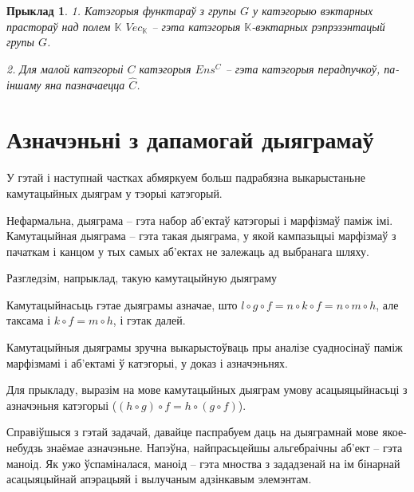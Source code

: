 \documentclass[a4paper,12pt]{book}
\newtheorem{example}{Прыклад}[section]
\begin{document}
\begin{example}
  1. Катэгорыя функтараў з групы $G$ у катэгорыю вэктарных прастораў над
  полем $\mathbb{K}$ $Vec_{\mathbb{K}}$ -- гэта катэгорыя
  $\mathbb{K}$-вэктарных рэпрэзэнтацый групы $G$.

  2. Для малой катэгорыі $C$ катэгорыя $Ens^C$ -- гэта катэгорыя
  перадпучкоў, па-іншаму яна пазначаецца $\hat{C}$.
\end{example}

\section{Азначэньні з дапамогай дыяграмаў}

У гэтай і наступнай частках абмяркуем больш падрабязна выкарыстаньне
камутацыйных дыяграм у тэорыі катэгорый.

Нефармальна, дыяграма -- гэта набор аб'ектаў катэгорыі і марфізмаў
паміж імі. Камутацыйная дыяграма -- гэта такая дыяграма, у якой
кампазыцыі марфізмаў з пачаткам і канцом у тых самых аб'ектах не
залежаць ад выбранага шляху.

Разгледзім, напрыклад, такую камутацыйную дыяграму


Камутацыйнасьць гэтае дыяграмы азначае, што $l \circ g \circ f = n
\circ k \circ f = n \circ m \circ h$, але таксама і $k \circ f = m
\circ h$, і гэтак далей.

Камутацыйныя дыяграмы зручна выкарыстоўваць пры аналізе суадносінаў
паміж марфізмамі і аб'ектамі ў катэгорыі, у доказ і азначэньнях.

Для прыкладу, выразім на мове камутацыйных дыяграм умову
асацыяцыйнасьці з азначэньня катэгорыі ($(h \circ g) \circ f = h
\circ (g \circ f)$).


Справіўшыся з гэтай задачай, давайце паспрабуем даць на дыяграмнай
мове якое-небудзь знаёмае азначэньне. Напэўна, найпрасьцейшы
альгебраічны аб'ект -- гэта маноід. Як ужо ўспаміналася, маноід --
гэта мноства з зададзенай на ім бінарнай асацыяцыйнай апэрацыяй і
вылучаным адзінкавым элемэнтам.
\end{document}
